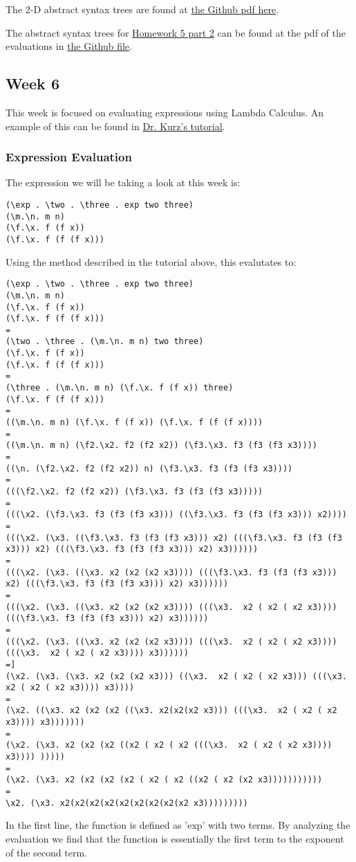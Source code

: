 \documentclass{article}
\theoremstyle{theorem}
\theoremstyle{definition}
\theoremstyle{remark}
\begin{document}
\noindent The 2-D abstract syntax trees are found at \href{https://github.com/dapak2002/Pak-D-CPSC-354-Report/blob/main/src/HW5.pdf}{the Github pdf here}.

\noindent The abstract syntax trees for \href{https://hackmd.io/@alexhkurz/H1e4Nv8Bv}{Homework 5 part 2} can be found at the pdf of the evaluations in \href{https://github.com/dapak2002/Pak-D-CPSC-354-Report/blob/main/src/Hw5-pt2.pdf}{the Github file}.

\subsection{Week 6}
This week is focused on evaluating expressions using Lambda Calculus. An example of this can be found in \href{https://youtu.be/for3Meg1Lbc}{Dr. Kurz's tutorial}. 

\subsubsection{Expression Evaluation}
The expression we will be taking a look at this week is:
\begin{lstlisting}
(\exp . \two . \three . exp two three)
(\m.\n. m n)
(\f.\x. f (f x))
(\f.\x. f (f (f x)))
\end{lstlisting}
Using the method described in the tutorial above, this evalutates to:
\begin{lstlisting}
(\exp . \two . \three . exp two three)
(\m.\n. m n)
(\f.\x. f (f x))
(\f.\x. f (f (f x)))
=
(\two . \three . (\m.\n. m n) two three)
(\f.\x. f (f x))
(\f.\x. f (f (f x)))
=
(\three . (\m.\n. m n) (\f.\x. f (f x)) three)
(\f.\x. f (f (f x)))
= 
((\m.\n. m n) (\f.\x. f (f x)) (\f.\x. f (f (f x))))
=
((\m.\n. m n) (\f2.\x2. f2 (f2 x2)) (\f3.\x3. f3 (f3 (f3 x3))))
=
((\n. (\f2.\x2. f2 (f2 x2)) n) (\f3.\x3. f3 (f3 (f3 x3))))
=
(((\f2.\x2. f2 (f2 x2)) (\f3.\x3. f3 (f3 (f3 x3)))))
=
(((\x2. (\f3.\x3. f3 (f3 (f3 x3))) ((\f3.\x3. f3 (f3 (f3 x3))) x2))))
=
(((\x2. (\x3. ((\f3.\x3. f3 (f3 (f3 x3))) x2) (((\f3.\x3. f3 (f3 (f3 x3))) x2) (((\f3.\x3. f3 (f3 (f3 x3))) x2) x3))))))
=
(((\x2. (\x3. ((\x3. x2 (x2 (x2 x3)))) (((\f3.\x3. f3 (f3 (f3 x3))) x2) (((\f3.\x3. f3 (f3 (f3 x3))) x2) x3))))))
=
(((\x2. (\x3. ((\x3. x2 (x2 (x2 x3)))) (((\x3.  x2 ( x2 ( x2 x3)))) (((\f3.\x3. f3 (f3 (f3 x3))) x2) x3))))))
=
(((\x2. (\x3. ((\x3. x2 (x2 (x2 x3)))) (((\x3.  x2 ( x2 ( x2 x3)))) (((\x3.  x2 ( x2 ( x2 x3)))) x3))))))
=]
(\x2. (\x3. (\x3. x2 (x2 (x2 x3))) ((\x3.  x2 ( x2 ( x2 x3))) (((\x3.  x2 ( x2 ( x2 x3)))) x3))))
=
(\x2. ((\x3. x2 (x2 (x2 ((\x3. x2(x2(x2 x3))) (((\x3.  x2 ( x2 ( x2 x3)))) x3)))))))
=
(\x2. (\x3. x2 (x2 (x2 ((x2 ( x2 ( x2 (((\x3.  x2 ( x2 ( x2 x3)))) x3)))) )))))
=
(\x2. (\x3. x2 (x2 (x2 (x2 ( x2 ( x2 ((x2 ( x2 (x2 x3)))))))))))
=
\x2. (\x3. x2(x2(x2(x2(x2(x2(x2(x2(x2 x3)))))))))
\end{lstlisting}
In the first line, the function is defined as 'exp' with two terms. By analyzing the evaluation we find that the function is essentially the first term to the exponent of the second term.
\end{document}
